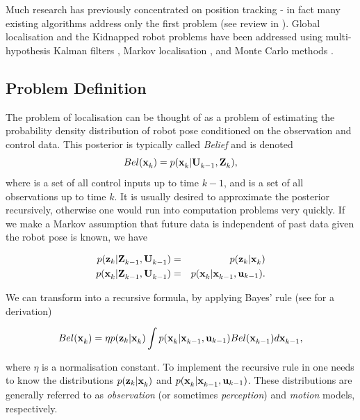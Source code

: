 Much research has previously concentrated on position tracking - in
fact many existing algorithms address only the first problem (see
review in \cite{Borenstein96}). Global localisation and the Kidnapped
robot problems have been addressed using multi-hypothesis Kalman
filters \cite{JensfeltKristensen01,Cox94}, Markov localisation
\cite{Fox99}, and Monte Carlo methods \cite{Thrun00j}.


\subsection{Problem Definition}

The problem of localisation can be thought of as a problem of
estimating the probability density distribution of robot pose
conditioned on the observation and control data.  This posterior is
typically called {\it Belief} and is denoted
\begin{equation}
  Bel(\x{k}{}{}) = p(\x{k}{}{} | \Uall{k-1}{}, \Zall{k}{}),
\label{eqn:localise_belief}
\end{equation}
where  is a set of all control inputs up to time $k-1$, and
 is a set of all observations up to time $k$. It is usually
desired to approximate the posterior recursively, otherwise one would
run into computation problems very quickly.  If we make a Markov
assumption that future data is independent of past data given the
robot pose is known, we have

\begin{eqnarray}
 p(\z{k} | \Zall{k-1}{}, \Uall{k-1}{})    &=& p(\z{k} | \x{k}{}{}) \\
 p(\x{k}{}{} | \Zall{k-1}{}, \Uall{k-1}{})&=& p(\x{k}{}{} | \x{k-1}{}{}, \U{k-1}{}).
\end{eqnarray}

We can transform  into a recursive
formula, by applying Bayes' rule (see \cite{Thrun00j} for a derivation)

\begin{equation}
Bel(\x{k}{}{}) = \eta p(\z{k} | \x{k}{}{}) \int 
                     p(\x{k}{}{} | \x{k-1}{}{}, \U{k-1}{}) 
                     Bel(\x{k-1}{}{}) d \x{k-1}{}{},
\label{eqn:localise_recursion}
\end{equation}

where $\eta$ is a normalisation constant. To implement the recursive
rule in  one needs to know the
distributions $p(\z{k} | \x{k}{}{})$ and $p(\x{k}{}{} | \x{k-1}{}{},
\U{k-1}{})$. These distributions are generally referred to as {\it
observation} (or sometimes {\it perception}) and {\it motion} models,
respectively. 

